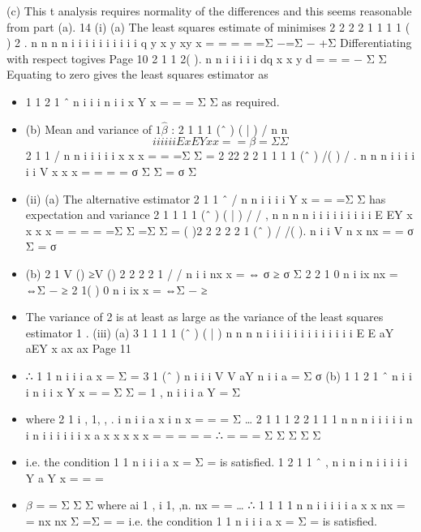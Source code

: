 \documentclass[a4paper,12pt]{article}
\begin{document}
(c) This t analysis requires normality of the differences and this seems
reasonable from part (a).
14 (i) (a) The least squares estimate of \beta minimises
2 2 2 2
1 1 1 1 ( ) 2 . n n n n
i i i i i i i i i i q y x y xy x = = = = =Σ −\beta =Σ −  +\beta Σ
Differentiating with respect to\beta gives
Page 10
2
1 1 2( ). n n
i i i i i
dq x x y
d = = = \beta −
\beta Σ Σ
Equating to zero gives the least squares estimator as
\begin{itemize}
\item 
1
1 2
1
ˆ
n
i i i
n
i i
x Y
x
=
=
\beta = Σ
Σ
as required.
\item (b) Mean and variance of $1 \hat{\beta}$ :
2
1 1 1
(ˆ ) ( | ) / n n
\[i i i i i i E x E Y x x = = \beta =Σ Σ\]
2
1 1 / n n
i i i i i x x x = = =Σ \beta Σ =  2 22 2 2
1 1 1 1
(ˆ ) /( ) / . n n n
i i i i i i V x x x = = = \beta = σ Σ Σ = σ Σ
\item (ii) (a) The alternative estimator 2 1 1
ˆ / n n
i i i i Y x = = \beta =Σ Σ has expectation and
variance
2 1 1 1 1
(ˆ ) ( | ) / / , n n n n
i i i i i i i i i E EY x x x x = = = = \beta =Σ Σ =Σ \beta Σ = \beta
( )2
2 2 2
2 1
(ˆ ) / /( ). n
i i V n x nx = \beta = σ Σ = σ
\item (b) 2 1 V ( ) ≥V ( )
2 2 2 2
1 / / n
i i nx x = ⇔ σ ≥ σ Σ
2 2
1 0 n
i ix nx = ⇔Σ − ≥
2
1( ) 0 n
i ix x = ⇔Σ − ≥
\item The variance of 2 \hat{\beta} is at least as large as the variance of the least
squares estimator 1 \hat{\beta} .
(iii) (a) 3
1 1 1 1
(ˆ ) ( | )
n n n n
i i i i i i i i i
i i i i
E E aY aEY x ax ax
Page 11
\item ∴ %
1
1
n
i i
i
a x
=
Σ =
3
1
(ˆ )
n
i i
i
V V aY
n
i
i
a
=
Σ σ
(b) 1
1
2
1
ˆ
n
i i
i
n
i
i
x Y
x
=
=
Σ
Σ
=
1
,
n
i i
i
a Y
= Σ
\item where
2
1
i , 1, , .
i n
i
i
a x i n
x
=
= =
Σ
…
2
1
1 1 2 2
1 1
1
n
n n i
i i
i i n i n
i i
i i
i i
x
a x x x
x x
=
= =
= =
∴ = = =
Σ
Σ Σ
Σ Σ
\item i.e. the condition 1 1 n
i i i a x = Σ = is satisfied.
1
2
1
1
ˆ ,
n
i n
i
n i i
i
i
i
Y
a Y
x
=
=
=
\item $\beta$ = =
Σ
Σ
Σ
where ai 1 , i 1, ,n.
nx
= = …
∴
1 1
1 1
n n
i i i
i i
a x x nx
= = nx nx
Σ =Σ = =
i.e. the condition 1 1 n
i i i a x = Σ = is satisfied.
\end{itemize}
\end{document}
